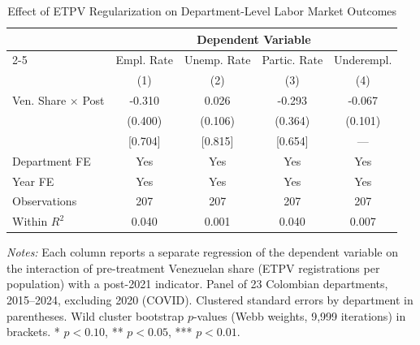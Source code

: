 \begin{table}[htbp]
\centering
\caption{Effect of ETPV Regularization on Department-Level Labor Market Outcomes}
\label{tab:main}
\begin{threeparttable}
\begin{tabular}{lcccc}
\hline\hline
& \multicolumn{4}{c}{Dependent Variable} \\
\cmidrule(lr){2-5}
& Empl. Rate & Unemp. Rate & Partic. Rate & Underempl. \\
& (1) & (2) & (3) & (4) \\
\hline
Ven. Share $\times$ Post & -0.310 & 0.026 & -0.293 & -0.067 \\
 & (0.400) & (0.106) & (0.364) & (0.101) \\
 & [0.704] & [0.815] & [0.654] & --- \\
\hline
Department FE & Yes & Yes & Yes & Yes \\
Year FE & Yes & Yes & Yes & Yes \\
Observations & 207 & 207 & 207 & 207 \\
Within $R^2$ & 0.040 & 0.001 & 0.040 & 0.007 \\
\hline\hline
\end{tabular}
\begin{tablenotes}[flushleft]
\small
\item \textit{Notes:} Each column reports a separate regression of the dependent variable on the interaction of pre-treatment Venezuelan share (ETPV registrations per population) with a post-2021 indicator. Panel of 23 Colombian departments, 2015--2024, excluding 2020 (COVID). Clustered standard errors by department in parentheses. Wild cluster bootstrap $p$-values (Webb weights, 9{,}999 iterations) in brackets. * $p<0.10$, ** $p<0.05$, *** $p<0.01$.
\end{tablenotes}
\end{threeparttable}
\end{table}


